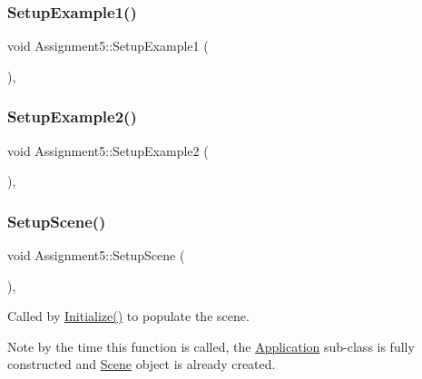 \subsubsection{\texorpdfstring{Setup\+Example1()}{SetupExample1()}}
{\footnotesize\ttfamily void Assignment5\+::\+Setup\+Example1 (\begin{DoxyParamCaption}{ }\end{DoxyParamCaption})\hspace{0.3cm}{\ttfamily [private]}, {\ttfamily [virtual]}}

\hypertarget{class_assignment5_ad8bde7598ac25e86667a2b0cb45ef399}{}\label{class_assignment5_ad8bde7598ac25e86667a2b0cb45ef399} 
\subsubsection{\texorpdfstring{Setup\+Example2()}{SetupExample2()}}
{\footnotesize\ttfamily void Assignment5\+::\+Setup\+Example2 (\begin{DoxyParamCaption}{ }\end{DoxyParamCaption})\hspace{0.3cm}{\ttfamily [private]}, {\ttfamily [virtual]}}

\hypertarget{class_assignment5_a43328e09e6241ae6c62a9b7be7659b3b}{}\label{class_assignment5_a43328e09e6241ae6c62a9b7be7659b3b} 
\subsubsection{\texorpdfstring{Setup\+Scene()}{SetupScene()}}
{\footnotesize\ttfamily void Assignment5\+::\+Setup\+Scene (\begin{DoxyParamCaption}{ }\end{DoxyParamCaption})\hspace{0.3cm}{\ttfamily [private]}, {\ttfamily [virtual]}}



Called by \hyperlink{class_application_a17cf1ea4552d26a1c20f7d98d793d41d}{Initialize()} to populate the scene. 

Note by the time this function is called, the \hyperlink{class_application}{Application} sub-\/class is fully constructed and \hyperlink{class_scene}{Scene} object is already created. 

